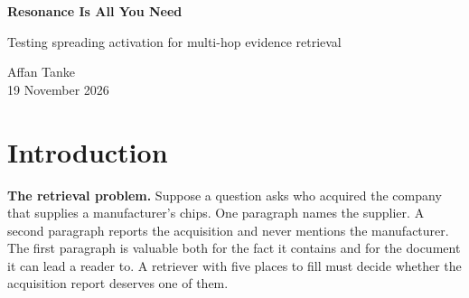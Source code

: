 \documentclass[11pt,a4paper]{article}
\begin{document}
\begin{center}
{\LARGE\bfseries Resonance Is All You Need\par}
\vspace{5pt}
{\large Testing spreading activation for multi-hop evidence retrieval\par}
\vspace{7pt}
Affan Tanke\\[2pt]
{\small 19 November 2026}
\end{center}

\begin{abstract}
A paragraph can identify the next piece of evidence without resembling the original question. Motivated by associative recall, the Resonant Memory Mesh (RMM) starts from semantically similar paragraphs and spreads activation along weighted links. We ask whether a newly reached paragraph can displace a starting paragraph within a fixed retrieval budget. We prove that, for a fresh mesh under the evaluated update rule, every starting paragraph scores at least as highly as every newly reached paragraph. Graph expansion can change membership in the top five only through ties. On 300 two-hop MuSiQue questions, RMM with shared-entity links retrieved 43.7\% of supporting paragraphs, compared with 66.5\% for cosine search and 60.2\% for personalized PageRank on the same graph. Breaking activation ties by query similarity reproduced the cosine top-five set on all 300 questions. A disjoint follow-up spanning two to four hops reproduced the set on 300 of 300 questions. On that follow-up, native graph ranking introduced 106 supporting paragraphs and displaced 253 that cosine search had found. In an exploratory replay that kept all five seeds and added graph suggestions, the combined list contained all supporting evidence on 103 follow-up questions. Extending cosine search to the same length per question did so on 92.
\end{abstract}

\section{Introduction}
\textbf{The retrieval problem.} Suppose a question asks who acquired the company that supplies a manufacturer's chips. One paragraph names the supplier. A second paragraph reports the acquisition and never mentions the manufacturer. The first paragraph is valuable both for the fact it contains and for the document it can lead a reader to. A retriever with five places to fill must decide whether the acquisition report deserves one of them.
\end{document}

